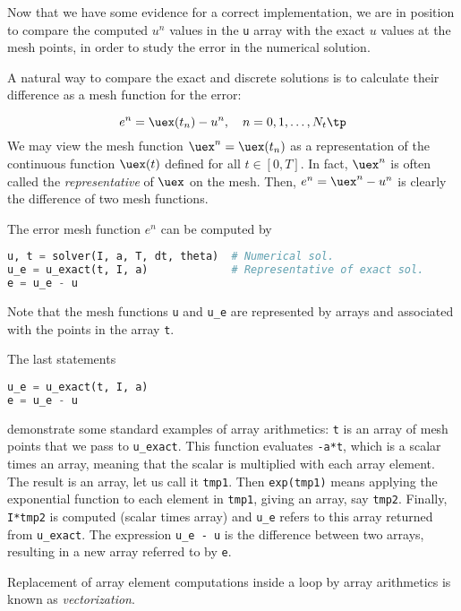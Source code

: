 \documentclass[graybox,sectrefs,envcountresetchap,open=right,final]{svmonodo}
\newenvironment{notice_mdfboxadmon}[1][]{
\begin{notice_mdfboxmdframed}[frametitle=#1]
}
{
\end{notice_mdfboxmdframed}
}
\begin{document}
Now that we have some evidence for a correct implementation, we are in
position to compare the computed $u^n$ values in the \texttt{u} array with
the exact $u$ values at the mesh points, in order to study the error
in the numerical solution.


A natural way to compare the exact and discrete solutions is to
calculate their difference as a mesh function for the error:

\begin{equation}
e^n = \uex(t_n) - u^n,\quad n=0,1,\ldots,N_t \tp
\end{equation}
We may view the mesh function
$\uex^n = \uex(t_n)$ as a representation of the continuous function $\uex(t)$
defined for all $t\in [0,T]$. In fact,
$\uex^n$ is often called the \emph{representative} of
$\uex$ on the mesh. Then, $e^n = \uex^n - u^n$ is clearly
the difference of two mesh functions.

The error mesh function $e^n$ can be computed by

\begin{lstlisting}[language=Python,style=blue1_bluegreen]
u, t = solver(I, a, T, dt, theta)  # Numerical sol.
u_e = u_exact(t, I, a)             # Representative of exact sol.
e = u_e - u
\end{lstlisting}
Note that the mesh functions \texttt{u} and \Verb!u_e! are represented by arrays
and associated with the points in the array \texttt{t}.

  


\begin{notice_mdfboxadmon}
The last statements

\begin{lstlisting}[language=Python,style=blue1_bluegreen]
u_e = u_exact(t, I, a)
e = u_e - u
\end{lstlisting}
demonstrate some standard examples of array arithmetics: \texttt{t} is an
array of mesh points that we pass to \Verb!u_exact!. This function
evaluates \texttt{-a*t}, which is a scalar times an array, meaning that
the scalar is multiplied with each array element.
The result is an array, let us call it \texttt{tmp1}. Then
\texttt{exp(tmp1)} means applying the exponential function to each element in
\texttt{tmp1}, giving an array, say \texttt{tmp2}. Finally, \texttt{I*tmp2} is computed
(scalar times array) and \Verb!u_e! refers to this array returned from
\Verb!u_exact!. The expression \Verb!u_e - u! is the difference between
two arrays, resulting in a new array referred to by \texttt{e}.

Replacement of array element computations inside a loop by array
arithmetics is known as \emph{vectorization}.
\end{notice_mdfboxadmon}
\end{document}
